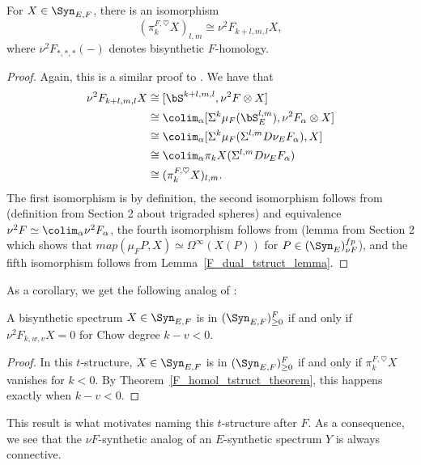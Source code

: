   \begin{theorem}
  \label{F_homol_tstruct_theorem}
      For $X\in\Syn_{E,F}$, there is an isomorphism
      $$
  (\pi_k^{F,\heartsuit}X)_{l,m}\cong\nu^2F_{k+l,m,l}X,
      $$
      where $\nu^2F_{*,*,*}(-)$ denotes bisynthetic $F$-homology.
  \end{theorem}
  
  \begin{proof}
      Again, this is a similar proof to \cite[Thm. 4.18]{Pst22}. We have that
      \begin{equation*}
       \begin{aligned}
        \nu^2F_{k+l,m,l}X&\cong [\bS^{k+l,m,l},\nu^2F\otimes X] \\
        &\cong \colim_\alpha[\Sigma^k\mu_F(\bS^{l,m}_E),\nu^2F_\alpha\otimes X] \\
        &\cong \colim_\alpha [\Sigma^k\mu_F(\Sigma^{l,m}D\nu_EF_\alpha),X] \\
        &\cong \colim_\alpha \pi_kX(\Sigma^{l,m}D\nu_EF_\alpha) \\
        &\cong (\pi_k^{F,\heartsuit}X)_{l,m}.
      \end{aligned}   
      \end{equation*}
   The first isomorphism is by definition, the second isomorphism follows from (definition from Section 2 about trigraded spheres) and equivalence $\nu^2F\simeq\colim_\alpha \nu^2F_\alpha$, the fourth isomorphism follows from (lemma from Section 2 which shows that $map(\mu_FP,X)\simeq \Omega^\infty(X(P))$ for $P\in(\Syn_E)_{\nu F}^{fp}$), and the fifth isomorphism follows from Lemma~\ref{F_dual_tstruct_lemma}.   
  \end{proof}
  
  As a corollary, we get the following analog of \cite[Cor. 4.19]{Pst22}:
  
  \begin{corollary}
  \label{F_chow_degree_cor}
  A bisynthetic spectrum $X\in\Syn_{E,F}$ is in $(\Syn_{E,F})_{\geq 0}^F$ if and only if $\nu^2F_{k,w,v}X =0$ for Chow degree $k-v<0$. 
  \end{corollary}
  
  \begin{proof}
      In this $t$-structure, $X\in\Syn_{E,F}$ is in $(\Syn_{E,F})_{\geq 0}^F$ if and only if $\pi_k^{F,\heartsuit}X$ vanishes for $k<0$. By Theorem~\ref{F_homol_tstruct_theorem}, this happens exactly when $k-v<0$.
  \end{proof}
  
  This result is what motivates naming this $t$-structure after $F$. As a consequence, we see that the $\nu F$-synthetic analog of an $E$-synthetic spectrum $Y$ is always connective.
  
